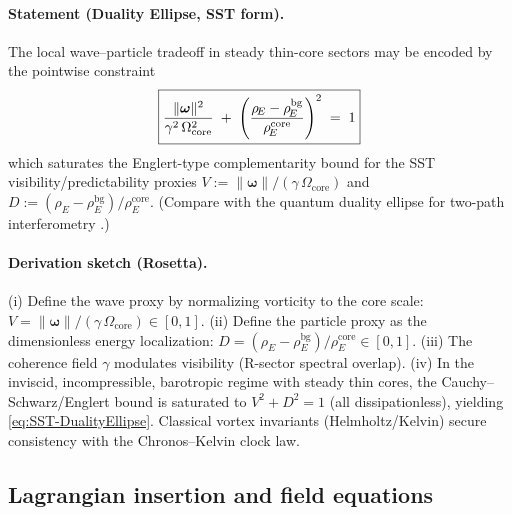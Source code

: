 \documentclass[10pt,reprint,aps,onecolumn,nofootinbib]{revtex4-2}
\newcommand{\rhoE}{\rho_{\!E}}                           %
\newcommand{\omegaVec}{\boldsymbol{\omega}}
\newcommand{\OmegaCore}{\Omega_{\mathrm{core}}}
\newcommand{\bg}{\mathrm{bg}}
\newcommand{\core}{\mathrm{core}}
\begin{document}
    \paragraph{Statement (Duality Ellipse, SST form).}
        The local wave–particle tradeoff in steady thin-core sectors may be encoded by the pointwise constraint
        \begin{equation}
            \boxed{%
                \frac{\lVert\omegaVec\rVert^{2}}{\gamma^{2}\,\OmegaCore^{2}}
                \;+\;
                \left(\frac{\rhoE-\rhoE^{\bg}}{\rhoE^{\core}}\right)^{2}
                \;=\;1
            }
            \label{eq:SST-DualityEllipse}
        \end{equation}
        which saturates the Englert-type complementarity bound for the SST visibility/predictability proxies
        $V:=\lVert\omegaVec\rVert/(\gamma\,\OmegaCore)$ and $D:=(\rhoE-\rhoE^{\bg})/\rhoE^{\core}$.
        (Compare with the quantum duality ellipse for two-path interferometry \cite{Englert1996,KhatiwadaQian2025}.)

    \paragraph{Derivation sketch (Rosetta).}
    (i) Define the wave proxy by normalizing vorticity to the core scale:
        $V=\lVert\omegaVec\rVert/(\gamma\,\OmegaCore)\in[0,1]$.
        (ii) Define the particle proxy as the dimensionless energy localization:
        $D=(\rhoE-\rhoE^{\bg})/\rhoE^{\core}\in[0,1]$.
        (iii) The coherence field $\gamma$ modulates visibility (R-sector spectral overlap).
        (iv) In the inviscid, incompressible, barotropic regime with steady thin cores, the Cauchy–Schwarz/Englert
        bound is saturated to $V^2+D^2=1$ (all dissipationless), yielding \eqref{eq:SST-DualityEllipse}.
        Classical vortex invariants (Helmholtz/Kelvin) secure consistency with the Chronos–Kelvin clock law.

    \subsection{Lagrangian insertion and field equations}
    \label{subsec:Lag-DE}
\end{document}
